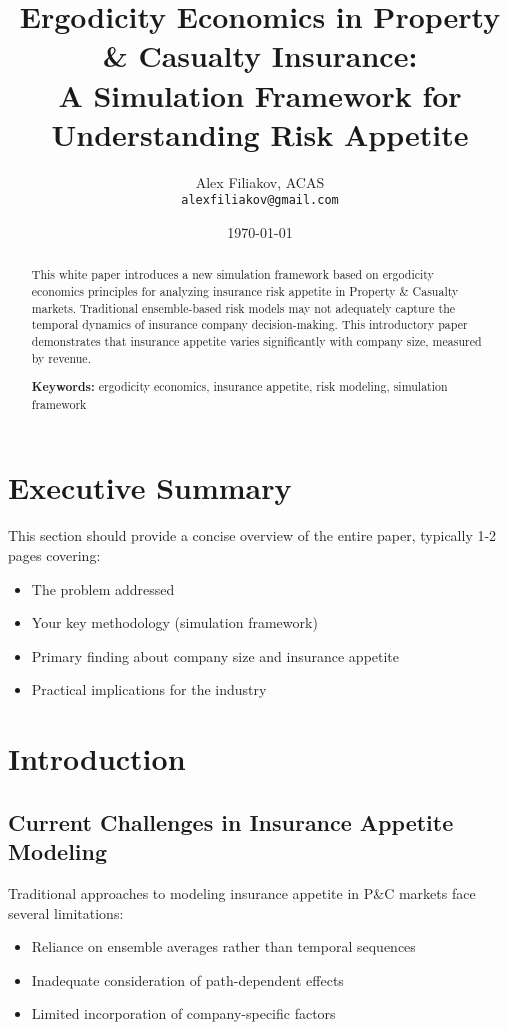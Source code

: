 \documentclass[11pt,letterpaper]{article}
\title{\Large \textbf{Ergodicity Economics in Property \& Casualty Insurance: \\
A Simulation Framework for Understanding Risk Appetite}}
\author{Alex Filiakov, ACAS\\
\texttt{alexfiliakov@gmail.com}}
\date{\today}
\begin{document}
\maketitle

\begin{abstract}
This white paper introduces a new simulation framework based on ergodicity economics principles for analyzing insurance risk appetite in Property \& Casualty markets. Traditional ensemble-based risk models may not adequately capture the temporal dynamics of insurance company decision-making. This introductory paper demonstrates that insurance appetite varies significantly with company size, measured by revenue.

\textbf{Keywords:} ergodicity economics, insurance appetite, risk modeling, simulation framework
\end{abstract}

\newpage
\tableofcontents
\newpage

\section{Executive Summary}

This section should provide a concise overview of the entire paper, typically 1-2 pages covering:
\begin{itemize}
    \item The problem addressed
    \item Your key methodology (simulation framework)
    \item Primary finding about company size and insurance appetite
    \item Practical implications for the industry
\end{itemize}


\section{Introduction}

\subsection{Current Challenges in Insurance Appetite Modeling}

Traditional approaches to modeling insurance appetite in P\&C markets face several limitations:
\begin{itemize}
    \item Reliance on ensemble averages rather than temporal sequences
    \item Inadequate consideration of path-dependent effects
    \item Limited incorporation of company-specific factors
\end{itemize}
\end{document}
